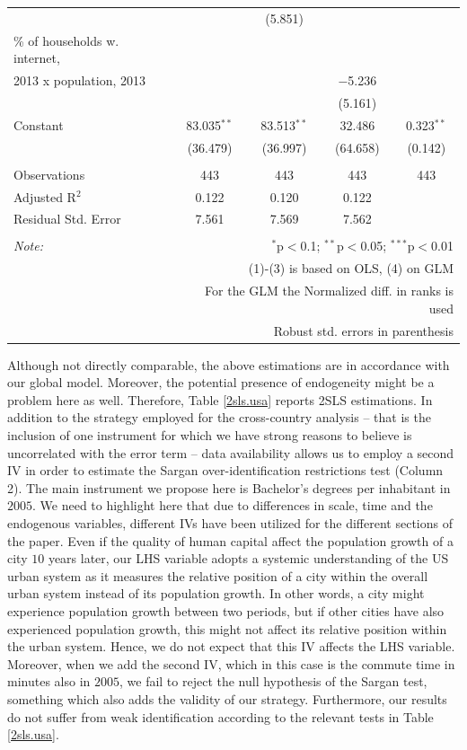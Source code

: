 \documentclass[10pt,letterpaper]{article}
\begin{document}
\begin{table}[!htbp]
\begin{tabular}{@{\extracolsep{1pt}}lcccc}
  &  & (5.851) &  &  \\ 
  \% of households w. internet, \\
                             2013 x population, 2013 &  &  & $-$5.236 &  \\ 
  &  &  & (5.161) &  \\ 
  Constant & 83.035$^{**}$ & 83.513$^{**}$ & 32.486 & 0.323$^{**}$ \\ 
  & (36.479) & (36.997) & (64.658) & (0.142) \\ 
 \hline \\[-1.8ex] 
Observations & 443 & 443 & 443 & 443 \\ 
Adjusted R$^{2}$ & 0.122 & 0.120 & 0.122 &  \\ 
Residual Std. Error & 7.561 & 7.569 & 7.562 &  \\ 
\hline 
\hline \\[-1.8ex] 
\textit{Note:}  & \multicolumn{4}{r}{$^{*}$p$<$0.1; $^{**}$p$<$0.05; $^{***}$p$<$0.01} \\ 
 & \multicolumn{4}{r}{(1)-(3) is based on OLS, (4) on GLM} \\ 
 & \multicolumn{4}{r}{For the GLM the Normalized diff. in ranks is used} \\ 
 & \multicolumn{4}{r}{Robust std. errors in parenthesis} \\ 
\end{tabular} 
\end{table}

Although not directly comparable, the above estimations are in
accordance with our global model. Moreover, the potential presence of
endogeneity might be a problem here as well. Therefore, Table
\ref{2sls.usa} reports 2SLS estimations. In addition to the strategy
employed for the cross-country analysis -- that is the inclusion of one
instrument for which we have strong reasons to believe is uncorrelated
with the error term -- data availability allows us to employ a second IV
in order to estimate the Sargan over-identification restrictions test
(Column 2). The main instrument we propose here is Bachelor's degrees
per inhabitant in \(2005\). We need to highlight here that due to
differences in scale, time and the endogenous variables, different IVs
have been utilized for the different sections of the paper. Even if the
quality of human capital affect the population growth of a city \(10\)
years later, our LHS variable adopts a systemic understanding of the US
urban system as it measures the relative position of a city within the
overall urban system instead of its population growth. In other words, a
city might experience population growth between two periods, but if
other cities have also experienced population growth, this might not
affect its relative position within the urban system. Hence, we do not
expect that this IV affects the LHS variable. Moreover, when we add the
second IV, which in this case is the commute time in minutes also in
\(2005\), we fail to reject the null hypothesis of the Sargan test,
something which also adds the validity of our strategy. Furthermore, our
results do not suffer from weak identification according to the relevant
tests in Table \ref{2sls.usa}.
\end{document}
